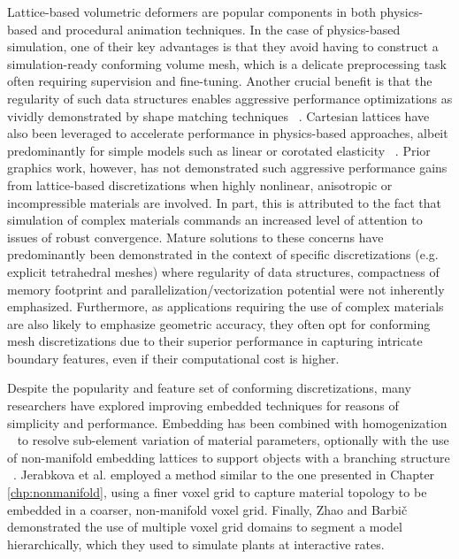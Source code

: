 Lattice-based volumetric deformers are popular components in both
physics-based and procedural animation techniques. In the case of
physics-based simulation, one of their key advantages is that they
avoid having to construct a simulation-ready conforming volume mesh,
which is a delicate preprocessing task often requiring supervision and
fine-tuning. Another crucial benefit is that the regularity of such
data structures enables aggressive performance optimizations as
vividly demonstrated by shape matching techniques
~\citep{RiverJ:2007}. Cartesian lattices have also been leveraged to
accelerate performance in physics-based approaches, albeit
predominantly for simple models such as linear or corotated elasticity
~\citep{MuellTG:2004,GeorgW:2008,McAdaZSETTS:2011}. Prior graphics
work, however, has not demonstrated such aggressive performance gains
from lattice-based discretizations when highly nonlinear, anisotropic
or incompressible materials are involved. In part, this is attributed
to the fact that simulation of complex materials commands an increased
level of attention to issues of robust convergence. Mature solutions
to these concerns have predominantly been demonstrated in the context
of specific discretizations (e.g. explicit tetrahedral meshes) where
regularity of data structures, compactness of memory footprint and
parallelization/vectorization potential were not inherently
emphasized. Furthermore, as applications requiring the use of complex
materials are also likely to emphasize geometric accuracy, they often
opt for conforming mesh discretizations due to their superior
performance in capturing intricate boundary features, even if their
computational cost is higher.

Despite the popularity and feature set of conforming discretizations,
many researchers have explored improving embedded techniques for
reasons of simplicity and performance. Embedding has been combined
with homogenization ~\citep{NesmePF:2006,KhareMOD:2009} to resolve
sub-element variation of material parameters, optionally with the use
of non-manifold embedding lattices to support objects with a branching
structure ~\citep{NesmeKJF:2009}.  Jerabkova et al.\!
 employed a method similar to the one
presented in Chapter \ref{chp:nonmanifold}, using a finer voxel grid
to capture material topology to be embedded in a coarser, non-manifold
voxel grid. Finally, Zhao and Barbi\v{c} 
demonstrated the use of multiple voxel grid domains to segment a model
hierarchically, which they used to simulate plants at interactive
rates.

